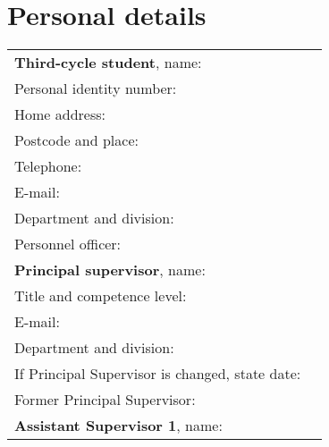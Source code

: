 \section{Personal details}
\begin{tabular}{p{8.5cm}p{6.5cm}}
\textbf{Third-cycle student}, name:       &\cellcolor[gray]{0.95}\bf					  \\
\hspace{.7cm} Personal identity number:   &\cellcolor[gray]{0.95}   					  \\
\hspace{.7cm} Home address:               &\cellcolor[gray]{0.95}   					  \\
\hspace{.7cm} Postcode and place:         &\cellcolor[gray]{0.95}   					  \\
\hspace{.7cm} Telephone:                  &\cellcolor[gray]{0.95}                         \\
\hspace{.7cm} E-mail:                     &\cellcolor[gray]{0.95}                         \\
\hspace{.7cm} Department and division:    &\cellcolor[gray]{0.95}                         \\
\hspace{.7cm} Personnel officer:          &\cellcolor[gray]{0.95}                         \\
%
\textbf{Principal supervisor}, name:      &\cellcolor[gray]{0.95}\bf                      \\
\hspace{.7cm} Title and competence level: &\cellcolor[gray]{0.95}                         \\
\hspace{.7cm} E-mail:                     &\cellcolor[gray]{0.95}                         \\
\hspace{.7cm} Department and division:    &\cellcolor[gray]{0.95}                         \\
\hspace{.7cm} If Principal Supervisor is changed, state date: &\cellcolor[gray]{0.95}     \\
\hspace{.7cm} Former Principal Supervisor:&\cellcolor[gray]{0.95}                         \\
%
\textbf{Assistant Supervisor 1}, name:    &\cellcolor[gray]{0.95}\bf                      \\

\end{tabular}
